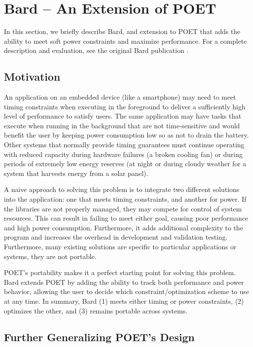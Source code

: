\section{Bard -- An Extension of POET}
\label{sec:poet-bard}

In this section, we briefly describe Bard, and extension to POET that adds the ability to meet soft power constraints and maximize performance.
For a complete description and evaluation, see the original Bard publication \cite{Bard}.


\subsection{Motivation}

An application on an embedded device (like a smartphone) may need to meet timing constraints when executing in the foreground to deliver a sufficiently high level of performance to satisfy users.
The same application may have tasks that execute when running in the background that are not time-sensitive and would benefit the user by keeping power consumption low so as not to drain the battery.
Other systems that normally provide timing guarantees must continue operating with reduced capacity during hardware failures (\eg a broken cooling fan) or during periods of extremely low energy reserves (\eg at night or during cloudy weather for a system that harvests energy from a solar panel).

A naive approach to solving this problem is to integrate two different solutions into the application: one that meets timing constraints, and another for power.
If the libraries are not properly managed, they may compete for control of system resources.
This can result in failing to meet either goal, causing poor performance and high power consumption.
Furthermore, it adds additional complexity to the program and increases the overhead in development and validation testing.
Furthermore, many existing solutions are specific to particular applications or systems, \ie they are not portable.

POET's portability makes it a perfect starting point for solving this problem.
Bard extends POET by adding the ability to track both performance and power behavior, allowing the user to decide which constraint/optimization scheme to use at any time.
In summary, Bard (1) meets either timing or power constraints, (2) optimizes the other, and (3) remains portable across systems.


\subsection{Further Generalizing POET's Design}

